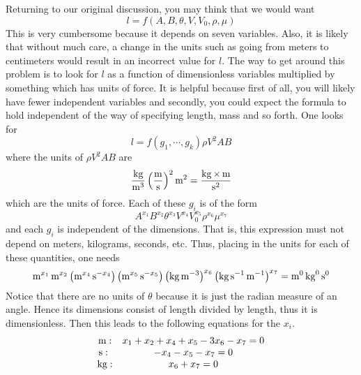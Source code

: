 Returning to our original discussion, you may think that we would want 
\begin{equation*}
l=f\left( A,B,\theta ,V,V_{0},\rho ,\mu \right) 
\end{equation*}
This is very cumbersome because it depends on seven variables. Also,
it is likely that without much care, a change in the units such as
going from meters to centimeters would result in an incorrect value
for $l$. The way to get around this problem is to look for $l $ as a
function of dimensionless variables multiplied by something which has
units of force. It is helpful because first of all, you will likely
have fewer independent variables and secondly, you could expect the
formula to hold independent of the way of specifying length, mass and
so forth. One looks for
\begin{equation*}
l=f\left( g_{1},\cdots ,g_{k}\right) \rho V^{2}AB
\end{equation*}
where the units of $\rho V^{2}AB$ are 
\begin{equation*}
\frac{\kg}{\m^{3}}\left( \frac{\m}{\s }\right) ^{2}\m^{2}=\frac{\kg\times \m}{%
\s ^{2}}
\end{equation*}
which are the units of force. Each of these $g_{i}$ is of the form 
\begin{equation}
A^{x_{1}}B^{x_{2}}\theta ^{x_{3}}V^{x_{4}}V_{0}^{x_{5}}\rho ^{x_{6}}\mu
^{x_{7}}  \label{11julye1f}
\end{equation}
and each $g_{i}$ is independent of the dimensions. That is, this expression
must not depend on meters, kilograms, seconds, etc. Thus, placing in the
units for each of these quantities, one needs 
\begin{equation*}
\mathop{\textrm{\rm m}}\nolimits^{x_{1}}\mathop{\textrm{\rm m}}\nolimits^{x_{2}}\left( \mathop{\textrm{\rm m}}\nolimits^{x_{4}}\mathop{\textrm{\rm s}}\nolimits ^{-x_{4}}\right) \left( \mathop{\textrm{\rm m}}\nolimits^{x_{5}}\mathop{\textrm{\rm s}}\nolimits
^{-x_{5}}\right) \left( \mathop{\textrm{\rm kg}}\nolimits\mathop{\textrm{\rm m}}\nolimits^{-3}\right) ^{x_{6}}\left( \mathop{\textrm{\rm kg}}\nolimits\mathop{\textrm{\rm s}}\nolimits
^{-1}\mathop{\textrm{\rm m}}\nolimits^{-1}\right) ^{x_{7}}=\mathop{\textrm{\rm m}}\nolimits^{0}\mathop{\textrm{\rm kg}}\nolimits^{0}\mathop{\textrm{\rm s}}\nolimits ^{0}
\end{equation*}
Notice that there are no units of $\theta$ because it is just the radian
measure of an angle. Hence its dimensions consist of length divided by
length, thus it is dimensionless. Then this leads to the following equations
for the $x_{i}.$
\begin{equation*}
\begin{array}{cc}
\m: & x_{1}+x_{2}+x_{4}+x_{5}-3x_{6}-x_{7}=0 \\ 
\s :\  & -x_{4}-x_{5}-x_{7}=0 \\ 
\kg: & x_{6}+x_{7}=0%
\end{array}
\end{equation*}
